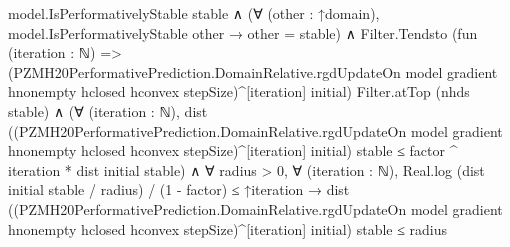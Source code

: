 \documentclass[10pt]{article}
\begin{document}
\begin{ReviewVerbatim}
                              model.IsPerformativelyStable stable ∧
                                (∀ (other : ↑domain), model.IsPerformativelyStable other → other = stable) ∧
                                  Filter.Tendsto
                                      (fun (iteration : ℕ) =>
                                        (PZMH20PerformativePrediction.DomainRelative.rgdUpdateOn model gradient
                                              hnonempty hclosed hconvex stepSize)^[iteration]
                                          initial)
                                      Filter.atTop (nhds stable) ∧
                                    (∀ (iteration : ℕ),
                                        dist
                                            ((PZMH20PerformativePrediction.DomainRelative.rgdUpdateOn model gradient
                                                  hnonempty hclosed hconvex stepSize)^[iteration]
                                              initial)
                                            stable ≤
                                          factor ^ iteration * dist initial stable) ∧
                                      ∀ radius > 0,
                                        ∀ (iteration : ℕ),
                                          Real.log (dist initial stable / radius) / (1 - factor) ≤ ↑iteration →
                                            dist
                                                ((PZMH20PerformativePrediction.DomainRelative.rgdUpdateOn model gradient
                                                      hnonempty hclosed hconvex stepSize)^[iteration]
                                                  initial)
                                                stable ≤
                                              radius
\end{ReviewVerbatim}
\end{document}
